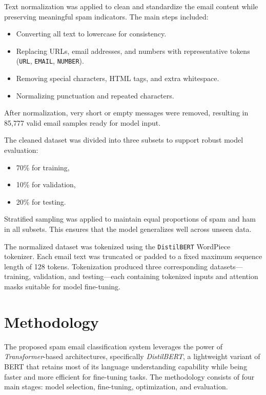 \documentclass[12pt]{article}
\begin{document}
Text normalization was applied to clean and standardize the email content while preserving meaningful spam indicators.  
The main steps included:
\begin{itemize}
    \item Converting all text to lowercase for consistency.
    \item Replacing URLs, email addresses, and numbers with representative tokens (\texttt{URL}, \texttt{EMAIL}, \texttt{NUMBER}).
    \item Removing special characters, HTML tags, and extra whitespace.
    \item Normalizing punctuation and repeated characters.
\end{itemize}

After normalization, very short or empty messages were removed, resulting in 85,777 valid email samples ready for model input.


The cleaned dataset was divided into three subsets to support robust model evaluation:
\begin{itemize}
    \item 70\% for training,
    \item 10\% for validation,
    \item 20\% for testing.
\end{itemize}

Stratified sampling was applied to maintain equal proportions of spam and ham in all subsets.  
This ensures that the model generalizes well across unseen data.

The normalized dataset was tokenized using the \texttt{DistilBERT} WordPiece tokenizer.  
Each email text was truncated or padded to a fixed maximum sequence length of 128 tokens.  
Tokenization produced three corresponding datasets—training, validation, and testing—each containing tokenized inputs and attention masks suitable for model fine-tuning.

\section{Methodology}

The proposed spam email classification system leverages the power of \textit{Transformer}-based architectures, specifically \textit{DistilBERT}, a lightweight variant of BERT that retains most of its language understanding capability while being faster and more efficient for fine-tuning tasks. The methodology consists of four main stages: model selection, fine-tuning, optimization, and evaluation.
\end{document}

